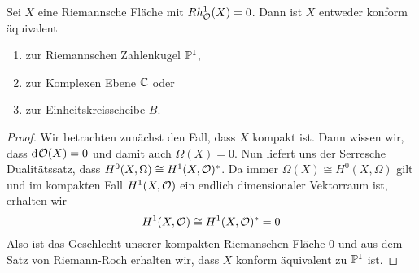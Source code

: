 \begin{thm}
  \label{thm:rmt}
  Sei $X$ eine Riemannsche Fläche mit $Rh_\hol^1(X) = 0$. Dann ist $X$
  entweder konform äquivalent
  \begin{enumerate}
  \item zur Riemannschen Zahlenkugel $\P^1$,
  \item zur Komplexen Ebene $\C$ oder
  \item zur Einheitskreisscheibe $B$.
  \end{enumerate}
\end{thm}

\begin{proof}
  Wir betrachten zunächst den Fall,
  dass $X$ kompakt ist. Dann wissen wir, dass $\d
  \hol(X) = 0$ und damit auch $\Omega(X) = 0$. Nun liefert uns der
  Serresche Dualitätssatz, dass $H^0(X, \Omega) \cong H^1(X,
  \hol)^\ast$. Da immer $\Omega(X) \cong H^0(X, \Omega)$ gilt
  und im kompakten Fall $H^1(X, \hol)$ ein endlich dimensionaler
  Vektorraum ist, erhalten wir
  \[
  H^1(X, \hol) \cong H^1(X, \hol)^\ast = 0
  \]
  Also ist das Geschlecht unserer kompakten Riemanschen Fläche 0 und
  aus dem Satz von Riemann-Roch erhalten wir, dass $X$ konform
  äquivalent zu $\P^1$ ist.


\end{proof}
